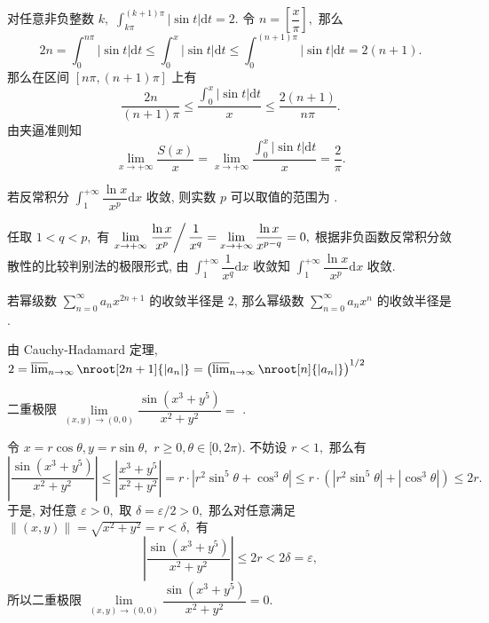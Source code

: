 \begin{solution}
对任意非负整数 $k,$ $\int_{k\pi}^{(k+1)\pi} \lvert \sin t \rvert \mathrm{d} t = 2.$ 令 $n = \left[ \dfrac{x}{\pi} \right],$ 那么
$$2n = \int_0^{n\pi} \lvert \sin t \rvert \mathrm{d} t \leqslant \int_0^x \lvert \sin t \rvert \mathrm{d} t \leqslant \int_0^{(n+1)\pi} \lvert \sin t \rvert \mathrm{d} t = 2(n+1).$$
那么在区间 $[n\pi, (n+1)\pi]$ 上有
$$\dfrac{2n}{(n+1)\pi} \leqslant \dfrac{\int_0^x \lvert \sin t \rvert \mathrm{d} t}{x} \leqslant \dfrac{2(n+1)}{n\pi}.$$
由夹逼准则知
$$\lim\limits_{x\to+\infty} \dfrac{S(x)}{x} = \lim\limits_{x\to+\infty} \dfrac{\int_0^x \lvert \sin t \rvert \mathrm{d} t}{x} = \dfrac{2}{\pi}.$$
\end{solution}

\begin{question}
若反常积分 $\int_1^{+\infty} \dfrac{\ln x}{x^p} \mathrm{d} x$ 收敛, 则实数 $p$ 可以取值的范围为 \fillin[$(1, +\infty)$ (或写 $p > 1$)].
\end{question}

\begin{solution}
任取 $1 < q < p,$ 有 $\lim\limits_{x\to+\infty} \left. \dfrac{\ln x}{x^p} \right/ \dfrac{1}{x^q} = \lim\limits_{x\to+\infty} \dfrac{\ln x}{x^{p-q}} = 0,$ 根据非负函数反常积分敛散性的比较判别法的极限形式, 由 $\int_1^{+\infty} \dfrac{1}{x^q} \mathrm{d} x$ 收敛知 $\int_1^{+\infty} \dfrac{\ln x}{x^p} \mathrm{d} x$ 收敛.
\end{solution}

\begin{question}
若幂级数 $\sum\limits_{n=0}^\infty a_n x^{2n+1}$ 的收敛半径是 $2$, 那么幂级数 $\sum\limits_{n=0}^\infty a_n x^n$ 的收敛半径是 \fillin[$4$].
\end{question}

\begin{solution}
由 Cauchy-Hadamard 定理, $2 = \varlimsup_{n\to\infty}\nroot[2n+1]{\lvert a_n
\rvert} = \left( \varlimsup_{n\to\infty}\nroot[n]{\lvert a_n \rvert} \right)^{1/2}$
\end{solution}

\begin{question}
二重极限 $\lim\limits_{(x,y) \to (0,0)} \dfrac{\sin(x^3 + y^5)}{x^2 + y^2} =$ \fillin[$0$].
\end{question}

\begin{solution}
令 $x = r\cos\theta, y = r\sin\theta,$ $r \geqslant 0, \theta \in [0, 2\pi).$ 不妨设 $r < 1,$ 那么有
$$\left\lvert \dfrac{\sin(x^3 + y^5)}{x^2 + y^2} \right\rvert \leqslant \left\lvert \dfrac{x^3 + y^5}{x^2 + y^2} \right\rvert = r \cdot \left\lvert r^2\sin^5\theta + \cos^3\theta \right\rvert \leqslant r \cdot \left( \left\lvert r^2\sin^5\theta \right\rvert + \left\lvert \cos^3\theta \right\rvert \right) \leqslant 2 r.$$
于是, 对任意 $\varepsilon > 0,$ 取 $\delta = \varepsilon / 2 > 0,$ 那么对任意满足 $\lVert (x, y) \rVert = \sqrt{x^2 + y^2} = r < \delta,$ 有
$$\left\lvert \dfrac{\sin(x^3 + y^5)}{x^2 + y^2} \right\rvert \leqslant 2r < 2\delta = \varepsilon,$$
所以二重极限 $\lim\limits_{(x,y) \to (0,0)} \dfrac{\sin(x^3 + y^5)}{x^2 + y^2} = 0.$
\end{solution}


